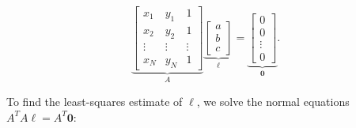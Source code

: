 \begin{problem}
\begin{enumroman}
\begin{answer}
        \[
          \underbrace{\begin{bmatrix}
            x_1 & y_1 & 1 \\
            x_2 & y_2 & 1 \\
            \vdots & \vdots & \vdots \\
            x_N & y_N & 1
          \end{bmatrix}}_{A}
          \underbrace{\begin{bmatrix}
            a \\
            b \\
            c
          \end{bmatrix}}_{\ell}
          =
          \underbrace{\begin{bmatrix}
            0 \\
            0 \\
            \vdots \\
            0
          \end{bmatrix}}_{\mathbf{0}}.
        \]

        \newpage
        To find the least-squares estimate of $\ell$, we solve the
        normal equations $A^T A \ell = A^T \mathbf{0}$:


\end{answer}
\end{enumroman}
\end{problem}
